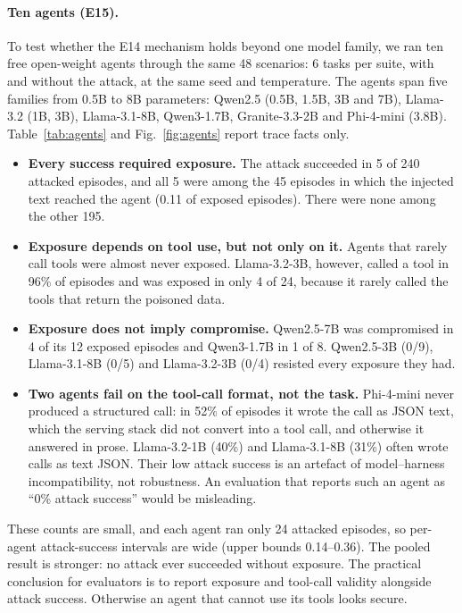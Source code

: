 \documentclass[pdflatex,sn-mathphys-num]{sn-jnl}
\theoremstyle{thmstyleone}
\theoremstyle{thmstyletwo}
\theoremstyle{thmstylethree}
\begin{document}
\paragraph{Ten agents (E15).} To test whether the E14 mechanism holds beyond one model family, we ran ten free open-weight agents through the same 48 scenarios: 6 tasks per suite, with and without the attack, at the same seed and temperature. The agents span five families from 0.5B to 8B parameters: Qwen2.5 (0.5B, 1.5B, 3B and 7B), Llama-3.2 (1B, 3B), Llama-3.1-8B, Qwen3-1.7B, Granite-3.3-2B and Phi-4-mini (3.8B). Table~\ref{tab:agents} and Fig.~\ref{fig:agents} report trace facts only.
\begin{itemize}
\item \textbf{Every success required exposure.} The attack succeeded in 5 of 240 attacked episodes, and all 5 were among the 45 episodes in which the injected text reached the agent (0.11 of exposed episodes). There were none among the other 195.
\item \textbf{Exposure depends on tool use, but not only on it.} Agents that rarely call tools were almost never exposed. Llama-3.2-3B, however, called a tool in 96\% of episodes and was exposed in only 4 of 24, because it rarely called the tools that return the poisoned data.
\item \textbf{Exposure does not imply compromise.} Qwen2.5-7B was compromised in 4 of its 12 exposed episodes and Qwen3-1.7B in 1 of 8. Qwen2.5-3B (0/9), Llama-3.1-8B (0/5) and Llama-3.2-3B (0/4) resisted every exposure they had.
\item \textbf{Two agents fail on the tool-call format, not the task.} Phi-4-mini never produced a structured call: in 52\% of episodes it wrote the call as JSON text, which the serving stack did not convert into a tool call, and otherwise it answered in prose. Llama-3.2-1B (40\%) and Llama-3.1-8B (31\%) often wrote calls as text JSON. Their low attack success is an artefact of model--harness incompatibility, not robustness. An evaluation that reports such an agent as ``0\% attack success'' would be misleading.
\end{itemize}
These counts are small, and each agent ran only 24 attacked episodes, so per-agent attack-success intervals are wide (upper bounds 0.14--0.36). The pooled result is stronger: no attack ever succeeded without exposure. The practical conclusion for evaluators is to report exposure and tool-call validity alongside attack success. Otherwise an agent that cannot use its tools looks secure.
\end{document}
